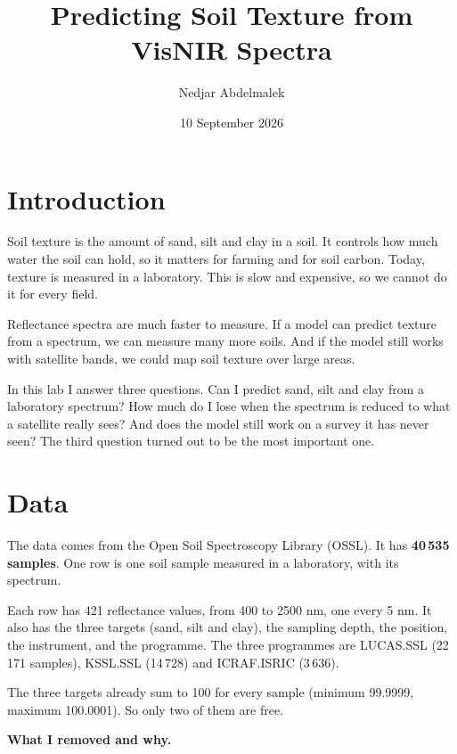 \documentclass[10pt,a4paper]{article}
\title{\vspace{-1.5cm}Predicting Soil Texture from VisNIR Spectra}
\author{Nedjar Abdelmalek}
\date{10 September 2026}
\begin{document}
\maketitle

\section{Introduction}

Soil texture is the amount of sand, silt and clay in a soil. It controls how much water the
soil can hold, so it matters for farming and for soil carbon. Today, texture is measured in a
laboratory. This is slow and expensive, so we cannot do it for every field.

Reflectance spectra are much faster to measure. If a model can predict texture from a
spectrum, we can measure many more soils. And if the model still works with satellite bands,
we could map soil texture over large areas.

In this lab I answer three questions. Can I predict sand, silt and clay from a laboratory
spectrum? How much do I lose when the spectrum is reduced to what a satellite really sees?
And does the model still work on a survey it has never seen? The third question turned out to
be the most important one.

\section{Data}

The data comes from the Open Soil Spectroscopy Library (OSSL). It has \textbf{40\,535
samples}. One row is one soil sample measured in a laboratory, with its spectrum.

Each row has 421 reflectance values, from 400 to 2500 nm, one every 5 nm. It also has the
three targets (sand, silt and clay), the sampling depth, the position, the instrument, and
the programme. The three programmes are LUCAS.SSL (22\,171 samples), KSSL.SSL (14\,728) and
ICRAF.ISRIC (3\,636).

The three targets already sum to 100 for every sample (minimum 99.9999, maximum 100.0001).
So only two of them are free.

\textbf{What I removed and why.}
\end{document}
